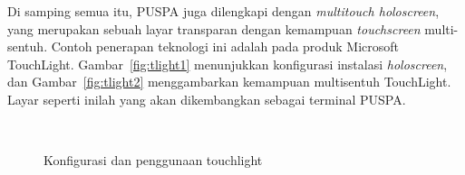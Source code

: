 Di samping semua itu,
PUSPA juga dilengkapi dengan \textit{multitouch holoscreen},
yang merupakan sebuah layar transparan dengan kemampuan \textit{touchscreen} multi-sentuh.
Contoh penerapan teknologi ini adalah pada produk Microsoft TouchLight.
Gambar~\ref{fig:tlight1} menunjukkan konfigurasi instalasi \textit{holoscreen},
dan Gambar~\ref{fig:tlight2} menggambarkan kemampuan multisentuh TouchLight.
Layar seperti inilah yang akan dikembangkan sebagai terminal PUSPA.
\begin{figure}
	\centering
		\\
	\caption{Konfigurasi dan penggunaan touchlight}
	\label{fig:tlight}
\end{figure}	
